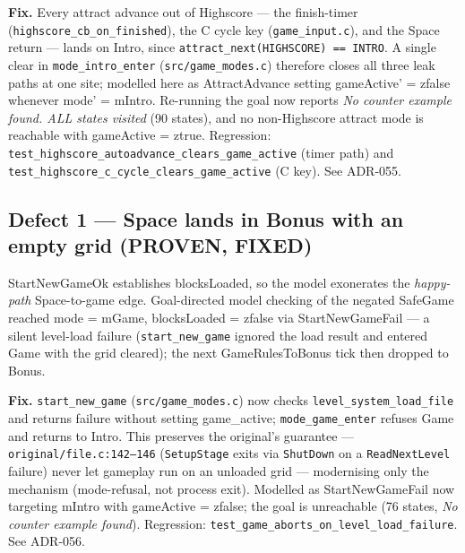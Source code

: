 \documentclass[a4paper,10pt,fleqn]{article}
\begin{document}
\textbf{Fix.} Every attract advance out of \textsf{Highscore} --- the
finish-timer (\texttt{highscore\_cb\_on\_finished}), the C cycle key
(\texttt{game\_input.c}), and the \textsf{Space} return --- lands on
\textsf{Intro}, since \texttt{attract\_next(HIGHSCORE) == INTRO}.  A
single clear in \texttt{mode\_intro\_enter} (\texttt{src/game\_modes.c})
therefore closes all three leak paths at one site; modelled here as
\textsf{AttractAdvance} setting \textsf{gameActive'} = \textsf{zfalse}
whenever \textsf{mode'} = \textsf{mIntro}.  Re-running the goal now
reports \emph{No counter example found. ALL states visited} (90 states),
and no non-\textsf{Highscore} attract mode is reachable with
\textsf{gameActive} = \textsf{ztrue}.  Regression:
\texttt{test\_highscore\_autoadvance\_clears\_game\_active} (timer path)
and \texttt{test\_highscore\_c\_cycle\_clears\_game\_active} (C key).
See ADR-055.

\subsection*{Defect 1 --- Space lands in Bonus with an empty grid
  (PROVEN, FIXED)}

\textsf{StartNewGameOk} establishes \textsf{blocksLoaded}, so the model
exonerates the \emph{happy-path} \textsf{Space}-to-game edge.  Goal-directed
model checking of the negated \textsf{SafeGame} reached \textsf{mode} =
\textsf{mGame}, \textsf{blocksLoaded} = \textsf{zfalse} via
\textsf{StartNewGameFail} --- a silent level-load failure
(\texttt{start\_new\_game} ignored the load result and entered
\textsf{Game} with the grid cleared); the next \textsf{GameRulesToBonus}
tick then dropped to \textsf{Bonus}.

\textbf{Fix.} \texttt{start\_new\_game} (\texttt{src/game\_modes.c}) now
checks \texttt{level\_system\_load\_file} and returns failure without
setting \textsf{game\_active}; \texttt{mode\_game\_enter} refuses
\textsf{Game} and returns to \textsf{Intro}.  This preserves the
original's guarantee --- \texttt{original/file.c:142--146}
(\texttt{SetupStage} exits via \texttt{ShutDown} on a
\texttt{ReadNextLevel} failure) never let gameplay run on an unloaded
grid --- modernising only the mechanism (mode-refusal, not process
exit).  Modelled as \textsf{StartNewGameFail} now targeting
\textsf{mIntro} with \textsf{gameActive} = \textsf{zfalse}; the goal is
unreachable (76 states, \emph{No counter example found}).  Regression:
\texttt{test\_game\_aborts\_on\_level\_load\_failure}.  See ADR-056.
\end{document}

